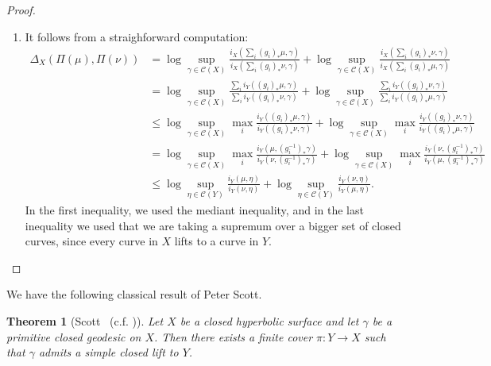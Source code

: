 \documentclass[12pt]{amsart}
\numberwithin{equation}{section}
\numberwithin{figure}{section}
\newtheorem{theorem}[equation]{Theorem}
\theoremstyle{definition}
\theoremstyle{plain}
\begin{document}
\begin{proof}
\begin{enumerate}
\item It follows from a straighforward computation:
\begin{align*}
\Delta_X(\Pi(\mu), \Pi(\nu))
&= \log \sup_{\gamma \in \mathcal{C}(X)}
   \frac{i_X\!\left(\sum_i (g_i)_\ast \mu, \gamma\right)}
        {i_X\!\left(\sum_i (g_i)_\ast \nu, \gamma\right)}
 + \log \sup_{\gamma \in \mathcal{C}(X)}
   \frac{i_X\!\left(\sum_i (g_i)_\ast \nu, \gamma\right)}
        {i_X\!\left(\sum_i (g_i)_\ast \mu, \gamma\right)} \\
&= \log \sup_{\gamma \in \mathcal{C}(X)}
   \frac{\sum_i i_Y((g_i)_\ast \mu, \gamma)}
        {\sum_i i_Y((g_i)_\ast \nu, \gamma)}
 + \log \sup_{\gamma \in \mathcal{C}(X)}
   \frac{\sum_i i_Y((g_i)_\ast \nu, \gamma)}
        {\sum_i i_Y((g_i)_\ast \mu, \gamma)} \\
&\leq \log \sup_{\gamma \in \mathcal{C}(X)}
   \max_i \frac{i_Y((g_i)_\ast \mu, \gamma)}
                {i_Y((g_i)_\ast \nu, \gamma)}
 + \log \sup_{\gamma \in \mathcal{C}(X)}
   \max_i \frac{i_Y((g_i)_\ast \nu, \gamma)}
                {i_Y((g_i)_\ast \mu, \gamma)} \\
&= \log \sup_{\gamma \in \mathcal{C}(X)}
   \max_i \frac{i_Y(\mu, (g_i^{-1})_\ast\gamma)}
                {i_Y(\nu, (g_i^{-1})_\ast\gamma)}
 + \log \sup_{\gamma \in \mathcal{C}(X)}
   \max_i \frac{i_Y(\nu, (g_i^{-1})_\ast\gamma)}
                {i_Y(\mu, (g_i^{-1})_\ast\gamma)} \\
&\leq \log \sup_{\eta \in \mathcal{C}(Y)}
   \frac{i_Y(\mu, \eta)}
        {i_Y(\nu, \eta)}
 + \log \sup_{\eta \in \mathcal{C}(Y)}
   \frac{i_Y(\nu, \eta)}
        {i_Y(\mu, \eta)}.
\end{align*}
In the first inequality, we used the mediant inequality,
and in the last inequality we used that we are taking a supremum over a bigger set of closed curves, since every curve in $X$ lifts to a curve in $Y$.

\end{enumerate}
\end{proof}

We have the following classical result of Peter Scott.

\begin{theorem}[{Scott~\cite[Theorem~3.3]{Sco78:SurfaceGeometric} (c.f. \cite{Sco85:SurfaceGeometric_Erratum})}]
Let $X$ be a closed hyperbolic surface and let $\gamma$ be a primitive closed geodesic on $X$.
Then there exists a finite cover $\pi:Y\to X$ such that $\gamma$ admits a simple closed lift to $Y$.
\label{thm:scott}
\end{theorem}
\end{document}
